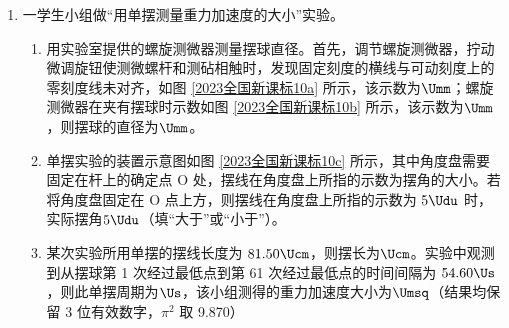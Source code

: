 \documentclass[\gkver]{gaokaozhenti}
\begin{document}
\begin{enumerate}
\item
一学生小组做“用单摆测量重力加速度的大小”实验。
\begin{enumerate}
	\item
	用实验室提供的螺旋测微器测量摆球直径。首先，调节螺旋测微器，拧动微调旋钮使测微螺杆和测砧相触时，发现固定刻度的横线与可动刻度上的零刻度线未对齐，如图 \ref{2023全国新课标10a} 所示，该示数为$\Umm$；螺旋测微器在夹有摆球时示数如图 \ref{2023全国新课标10b} 所示，该示数为$\Umm$，则摆球的直径为$\Umm$。
	\item
	单摆实验的装置示意图如图 \ref{2023全国新课标10c} 所示，其中角度盘需要固定在杆上的确定点 O 处，摆线在角度盘上所指的示数为摆角的大小。若将角度盘固定在 O 点上方，则摆线在角度盘上所指的示数为 $5\Udu$ 时，实际摆角$5\Udu$（填“大于”或“小于”）。
	\item
	某次实验所用单摆的摆线长度为 $81.50\Ucm$，则摆长为$\Ucm$。实验中观测到从摆球第 1 次经过最低点到第 61 次经过最低点的时间间隔为 $54.60\Us$，则此单摆周期为$\Us$，该小组测得的重力加速度大小为$\Umsq$（结果均保留 3 位有效数字，$\pi^{2}$ 取 9.870）
\end{enumerate}

\end{enumerate}
\end{document}
